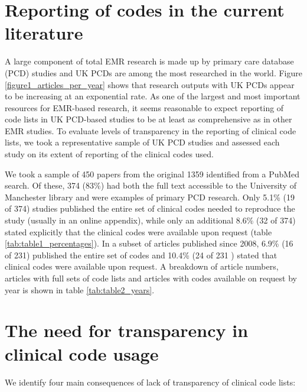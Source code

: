 \documentclass[10pt]{article}
\begin{document}
\section*{Reporting of codes in the current literature}

A large component of total EMR research is made up by primary care database (PCD) studies and UK PCDs are among the most researched in the world.  Figure \ref{figure1_articles_per_year} shows that research outputs with UK PCDs appear to be increasing at an exponential rate.  As one of the largest and most important resources for EMR-based research, it seems reasonable to expect reporting of code lists in UK PCD-based studies to be at least as comprehensive as in other EMR studies.  To evaluate levels of transparency in the reporting of clinical code lists, we took a representative sample of UK PCD studies and assessed each study on its extent of reporting of the clinical codes used.

We took a sample of 450 papers from the original 1359 identified from a PubMed search.  Of these, 374 (83\%) had both  the full text accessible to the University of Manchester library and were examples of primary PCD research.  Only 5.1\% (19 of 374) studies published the entire set of clinical codes needed to reproduce the study (usually in an online appendix), while only an additional 8.6\% (32 of 374) stated explicitly that the clinical codes were available upon request (table \ref{tab:table1_percentages}). In a subset of articles published since 2008, 6.9\% (16 of 231) published the entire set of codes and 10.4\% (24 of 231 ) stated that clinical codes were available upon request.  A breakdown of article numbers, articles with full sets of code lists and articles with codes available on request by year is shown in table \ref{tab:table2_years}.

\section*{The need for transparency in clinical code usage}


We identify four main consequences of lack of transparency of clinical code lists:
\end{document}
